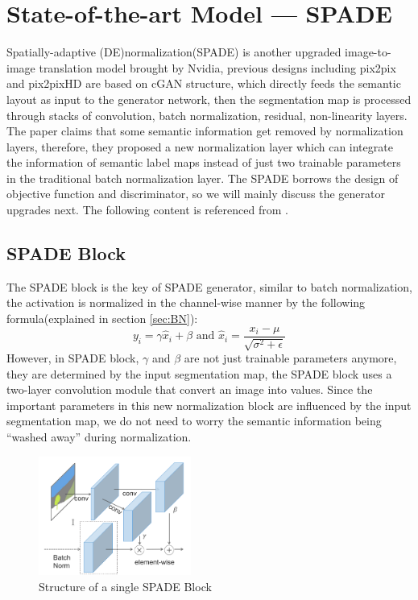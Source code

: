 \section{State-of-the-art Model — SPADE}
Spatially-adaptive (DE)normalization(SPADE) is another upgraded image-to-image 
translation model brought by Nvidia, previous designs including pix2pix \cite{pix2pix2016} and 
pix2pixHD \cite{wang2018pix2pixHD} are based on cGAN structure, which directly feeds the semantic 
layout as input to the generator network, then the segmentation map is processed through stacks 
of convolution, batch normalization, residual, non-linearity layers. The paper claims that 
some semantic information get removed by normalization layers, therefore, they proposed a new 
normalization layer which can integrate the information of semantic label maps instead of just 
two trainable parameters in the traditional batch normalization layer. The SPADE borrows the design 
of objective function and discriminator, so we will mainly discuss the generator upgrades next.
The following content is referenced from \cite{park2019SPADE}. 
\subsection{SPADE Block}
The SPADE block is the key of SPADE generator, similar to batch normalization, the activation is 
normalized in the channel-wise manner by the following formula(explained in section \ref{sec:BN}):
$$y_{i}=\gamma \hat{x}_{i}+\beta \text { and } \hat{x}_{i}=\frac{x_{i}-\mu}{\sqrt{\sigma^{2}+\epsilon}}$$
However, in SPADE block, $\gamma$ and $\beta$ are not just 
trainable parameters anymore, they are determined by the input segmentation map, the SPADE block uses
a two-layer convolution module that convert an image into values. Since the important parameters in
this new normalization block are influenced by the input segmentation map, we do not need to worry 
the semantic information being “washed away” during normalization.
\begin{figure}[H]
    \begin{center}
    \includegraphics[width=5cm]{figures/SPADE-Block}
    \end{center}
    \caption{Structure of a single SPADE Block}
    \label{fig:SPADE-Block}
\end{figure}

